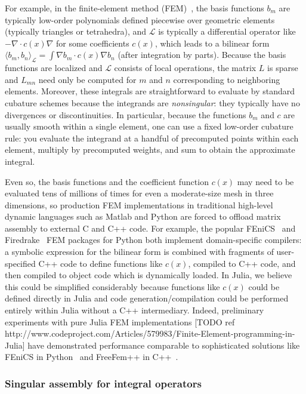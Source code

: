 For example, in the finite-element method (FEM)~\cite{Zienkiewicz13}, the basis functions $b_m$
are typically low-order polynomials defined piecewise over geometric elements
(typically triangles or tetrahedra), and $\mathcal{L}$ is typically a differential
operator like $-\nabla \cdot c(x) \nabla$ for some coefficients $c(x)$, which leads to
a bilinear form
$\langle b_m, b_n \rangle_\mathcal{L} = \int \nabla b_m \cdot c(x) \nabla b_n$
(after integration by parts).
Because the basis functions are localized and $\mathcal{L}$ consists of local operations,
the matrix $L$ is sparse and $L_{mn}$ need only be computed for $m$ and $n$ corresponding
to neighboring elements.
Moreover, these integrals are straightforward to evaluate by standard cubature schemes
because the integrands are \emph{nonsingular}: they typically have no divergences or
discontinuities.
In particular, because the functions $b_m$ and $c$ are usually smooth within a single
element, one can use a fixed low-order cubature rule: you evaluate the integrand at a
handful of precomputed points within each element, multiply by precomputed weights, and
sum to obtain the approximate integral.

Even so, the basis functions and the coefficient function $c(x)$ may need to be
evaluated tens of millions of times for even a moderate-size mesh in three dimensions,
so production FEM implementations in traditional high-level dynamic languages such as
Matlab and Python are forced to offload matrix assembly to external C and C++ code.
For example, the popular FEniCS~\cite{LoggOlgaardEtAl2012a} and
Firedrake~\cite{Rathgeber2015} FEM packages for
Python both implement domain-specific compilers: a symbolic expression for the bilinear
form is combined with fragments of user-specified C++ code to define functions like
$c(x)$, compiled to C++ code, and then compiled to object code which is dynamically
loaded.
In Julia, we believe this could be simplified considerably because functions like
$c(x)$ could be defined directly in Julia and code generation/compilation could be
performed entirely within Julia without a C++ intermediary.
Indeed, preliminary experiments with pure Julia FEM implementations
[TODO ref http://www.codeproject.com/Articles/579983/Finite-Element-programming-in-Julia]
have demonstrated performance comparable to sophisticated solutions like FEniCS in
Python~\cite{FEniCS12} and FreeFem++ in C++~\cite{MR3043640}.

\subsubsection{Singular assembly for integral operators}

